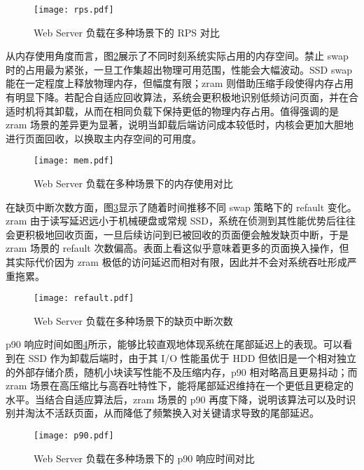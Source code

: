 \begin{figure}[htbp]
    \centering
    \texttt{[image: rps.pdf]}
    \caption{Web Server 负载在多种场景下的 RPS 对比}
    \label{fig:rps}
\end{figure}

从内存使用角度而言，图\ref{fig:mem}展示了不同时刻系统实际占用的内存空间。禁止  swap  时的占用最为紧张，一旦工作集超出物理可用范围，性能会大幅波动。SSD  swap  能在一定程度上释放物理内存，但幅度有限；zram 则借助压缩手段使得内存占用有明显下降。若配合自适应回收算法，系统会更积极地识别低频访问页面，并在合适时机将其卸载，从而在相同负载下保持更低的物理内存占用。值得强调的是 zram 场景的差异更为显著，说明当卸载后端访问成本较低时，内核会更加大胆地进行页面回收，以换取主内存空间的可用度。

\begin{figure}[htbp]
    \centering
    \texttt{[image: mem.pdf]}
    \caption{Web Server 负载在多种场景下的内存使用对比}
    \label{fig:mem}
\end{figure}

在缺页中断次数方面，图\ref{fig:refault}显示了随着时间推移不同  swap  策略下的 refault 变化。zram 由于读写延迟远小于机械硬盘或常规 SSD，系统在侦测到其性能优势后往往会更积极地回收页面，一旦后续访问到已被回收的页面便会触发缺页中断，于是 zram 场景的 refault 次数偏高。表面上看这似乎意味着更多的页面换入操作，但其实际代价因为 zram 极低的访问延迟而相对有限，因此并不会对系统吞吐形成严重拖累。

\begin{figure}[htbp]
    \centering
    \texttt{[image: refault.pdf]}
    \caption{Web Server 负载在多种场景下的缺页中断次数}
    \label{fig:refault}
\end{figure}

p90 响应时间如图\ref{fig:p90}所示，能够比较直观地体现系统在尾部延迟上的表现。可以看到在 SSD 作为卸载后端时，由于其 I/O 性能虽优于 HDD 但依旧是一个相对独立的外部存储介质，随机小块读写性能不及压缩内存，p90 相对略高且更易抖动；而 zram 场景在高压缩比与高吞吐特性下，能将尾部延迟维持在一个更低且更稳定的水平。当结合自适应算法后，zram 场景的 p90 再度下降，说明该算法可以及时识别并淘汰不活跃页面，从而降低了频繁换入对关键请求导致的尾部延迟。

\begin{figure}[htbp]
    \centering
    \texttt{[image: p90.pdf]}
    \caption{Web Server 负载在多种场景下的 p90 响应时间对比}
    \label{fig:p90}
\end{figure}

